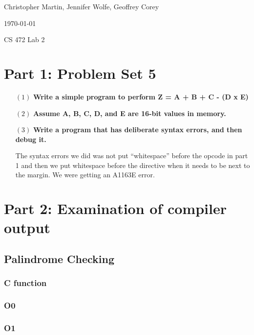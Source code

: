 \documentclass[letterpaper,10pt,titlepage]{article}
\def\name{Christopher Martin, Jennifer Wolfe, Geoffrey Corey}
\begin{document}
\hfill \name

\hfill \today

\hfill CS 472 Lab 2

\section*{Part 1: Problem Set 5}


\begin{enumerate}
\item[$(1)$] \textbf{Write a simple program to perform Z = A + B + C - (D x E)}


\item[$(2)$] \textbf{Assume A, B, C, D, and E are 16-bit values in memory.}

  
\item[$(3)$] \textbf{Write a program that has deliberate syntax errors, and then debug it.}

The syntax errors we did was not put “whitespace” before the opcode in part 1 and then we put whitespace before the directive when it needs to be next to the margin. We were getting an A1163E error.
\end{enumerate}

\section*{Part 2: Examination of compiler output}
\subsection*{Palindrome Checking}
\subsubsection*{C function}


\subsubsection*{O0}


\subsubsection*{O1}
\end{document}
